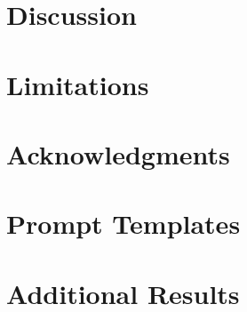 \documentclass[11pt]{article}
\begin{document}

\section{Discussion}
\label{sec:discussion}


\section*{Limitations}


\section*{Acknowledgments}




\appendix

\section{Prompt Templates}
\label{sec:prompts}


\section{Additional Results}
\label{sec:additional-results}

\end{document}
